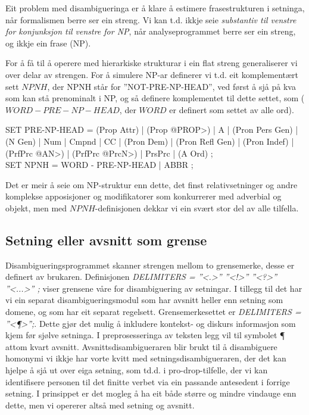 \documentclass[a4paper,norsk]{article}
\begin{document}
Eit problem med disambigueringa er å klare å estimere frasestrukturen i setninga, når formalismen berre ser ein streng. Vi kan t.d. ikkje seie \textit{substantiv til venstre for konjunksjon til venstre for NP}, når analyseprogrammet berre ser ein streng, og ikkje ein frase (NP). %

For å få til å operere med hierarkiske strukturar i ein flat streng generaliserer vi over delar av strengen. For å simulere NP-ar definerer vi t.d. eit komplementært sett $NPNH$, der NPNH står for ''NOT-PRE-NP-HEAD'', ved først å sjå på kva som kan stå prenominalt i NP, og så definere komplementet til dette settet, som ($WORD - PRE-NP-HEAD$, der $WORD$ er definert som settet av alle ord). %

\begin{example}
SET PRE-NP-HEAD = (Prop Attr) | (Prop @PROP>) | A | (Pron Pers Gen) | (N Gen) | 
                  Num | Cmpnd | CC | (Pron Dem)  | (Pron Refl Gen) | 
                  (Pron Indef) | (PrfPrc @AN>) |  (PrfPrc @PrcN>) | PrsPrc | (A Ord) ; \\
SET NPNH        = WORD - PRE-NP-HEAD | ABBR ; \\                 
\end{example}

Det er meir å seie om NP-struktur enn dette, det finst relativsetninger og andre komplekse apposisjoner og modifikatorer som konkurrerer med adverbial og objekt, men med $NPNH$-definisjonen dekkar vi ein svært stor del av alle tilfella. %

\subsection{Setning eller avsnitt som grense}

Disambigueringsprogrammet skanner strengen mellom to grensemerke, desse er definert av brukaren. Definisjonen \emph{DELIMITERS = ''<.>'' ''<!>'' ''<?>'' ''<...>'' ;} viser grensene våre for disambiguering av setningar. I tillegg til det har vi ein separat disambigueringsmodul som har avsnitt heller enn setning som domene, og som har eit separat regelsett. Grensemerkesettet er \emph{DELIMITERS = ''<¶>'';}. Dette gjør det mulig å inkludere kontekst- og diskurs informasjon som kjem før sjølve setninga. I preprosesseringa av teksten legg vil til symbolet ¶ attom kvart avsnitt. Avsnittsdisambigueraren blir brukt til å disambiguere homonymi vi ikkje har vorte kvitt med setningsdisambigueraren, der det kan hjelpe å sjå ut over eiga setning, som td.d. i pro-drop-tilfelle, der vi kan identifisere personen til det finitte verbet via ein passande antesedent i forrige setning. %
I prinsippet er det mogleg å ha eit både større og mindre vindauge enn dette, men vi opererer altså med setning og avsnitt. %
\end{document}
